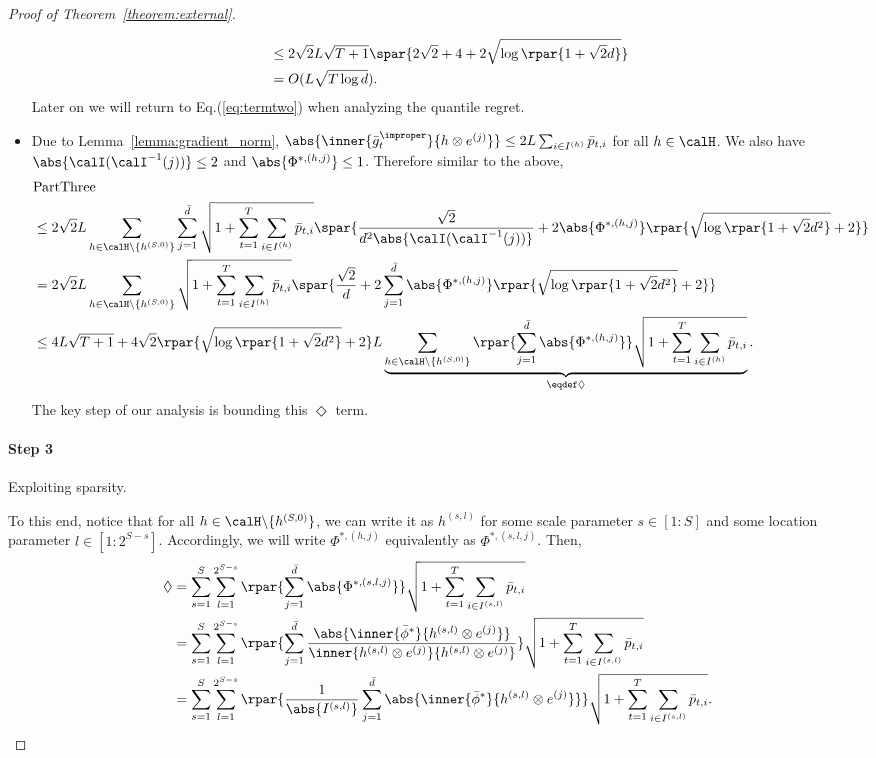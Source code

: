 \documentclass[10pt]{article}
\begin{document}
\begin{proof}[Proof of Theorem~\ref{theorem:external}]
\begin{itemize}
\begin{align*}
&\leq 2\sqrt{2}L\sqrt{T+1}\spar{2\sqrt{2}+4+2\sqrt{\log\rpar{1+\sqrt{2}d}}}\\
&=O(L\sqrt{T\log d}). 
\end{align*}
Later on we will return to Eq.(\ref{eq:termtwo}) when analyzing the quantile regret. 
\item Due to Lemma~\ref{lemma:gradient_norm}, $\abs{\inner{\bar g_t^\improper}{h\otimes e^{(j)}}}\leq 2L\sum_{i\in I^{(h)}}\bar p_{t,i}$ for all $h\in\calH$. We also have $\abs{\calI(\calI^{-1}(j))}\leq 2$ and $\abs{\Phi^{*,(h,j)}}\leq 1$. Therefore similar to the above, 
\begin{align*}
&\mathrm{PartThree}\\
&\leq 2\sqrt{2}L\sum_{h\in\calH\backslash\{h^{(S,0)}\}}\sum_{j=1}^{\bar d}\sqrt{1+\sum_{t=1}^T\sum_{i\in I^{(h)}}\bar p_{t,i}}\spar{\frac{\sqrt{2}}{d^2\abs{\calI(\calI^{-1}(j))}}+2\abs{\Phi^{*,(h,j)}}\rpar{\sqrt{\log\rpar{1+\sqrt{2}d^2}}+2}}\\
&= 2\sqrt{2}L\sum_{h\in\calH\backslash\{h^{(S,0)}\}}\sqrt{1+\sum_{t=1}^T\sum_{i\in I^{(h)}}\bar p_{t,i}}\spar{\frac{\sqrt{2}}{d}+2\sum_{j=1}^{\bar d}\abs{\Phi^{*,(h,j)}}\rpar{\sqrt{\log\rpar{1+\sqrt{2}d^2}}+2}}\\
&\leq 4L\sqrt{T+1}+4\sqrt{2}\rpar{\sqrt{\log\rpar{1+\sqrt{2}d^2}}+2}L\underbrace{\sum_{h\in\calH\backslash\{h^{(S,0)}\}}\rpar{\sum_{j=1}^{\bar d}\abs{\Phi^{*,(h,j)}}}\sqrt{1+\sum_{t=1}^T\sum_{i\in I^{(h)}}\bar p_{t,i}}}_{\eqdef\Diamond}.
\end{align*}
The key step of our analysis is bounding this $\Diamond$ term. 
\end{itemize}

\paragraph{Step 3} Exploiting sparsity. 

To this end, notice that for all $h\in\calH\backslash\{h^{(S,0)}\}$, we can write it as $h^{(s,l)}$ for some scale parameter $s\in[1:S]$ and some location parameter $l\in[1:2^{S-s}]$. Accordingly, we will write $\Phi^{*,(h,j)}$ equivalently as $\Phi^{*,(s,l,j)}$. Then, 
\begin{align*}
\Diamond&=\sum_{s=1}^S\sum_{l=1}^{2^{S-s}}\rpar{\sum_{j=1}^{\bar d}\abs{\Phi^{*,(s,l,j)}}}\sqrt{1+\sum_{t=1}^T\sum_{i\in I^{(s,l)}}\bar p_{t,i}}\\
&=\sum_{s=1}^S\sum_{l=1}^{2^{S-s}}\rpar{\sum_{j=1}^{\bar d}\frac{\abs{\inner{\bar\phi^*}{h^{(s,l)}\otimes e^{(j)}}}}{\inner{h^{(s,l)}\otimes e^{(j)}}{h^{(s,l)}\otimes e^{(j)}}}}\sqrt{1+\sum_{t=1}^T\sum_{i\in I^{(s,l)}}\bar p_{t,i}}\\
&=\sum_{s=1}^S\sum_{l=1}^{2^{S-s}}\rpar{\frac{1}{\abs{I^{(s,l)}}}\sum_{j=1}^{\bar d}\abs{\inner{\bar\phi^*}{h^{(s,l)}\otimes e^{(j)}}}}\sqrt{1+\sum_{t=1}^T\sum_{i\in I^{(s,l)}}\bar p_{t,i}}.
\end{align*}


\end{proof}
\end{document}
